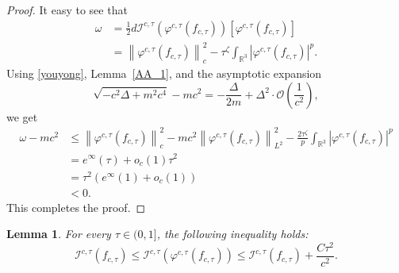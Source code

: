 \documentclass{amsart}
\theoremstyle{plain}
\newtheorem{lemma}[theorem]{Lemma}
\theoremstyle{definition}
\theoremstyle{remark}
\numberwithin{equation}{section} \numberwithin{figure}{section}
\begin{document}
          \begin{proof}
            It easy to see that
          \begin{equation*}
          \begin{aligned}
          \omega &= \frac{1}{2} d\mathcal{I}^{c,\tau}\left(\varphi^{c,\tau}(f_{c,\tau})\right)\left[\varphi^{c,\tau}(f_{c,\tau})\right] \\
          &= \left\|\varphi^{c,\tau}(f_{c,\tau})\right\|_c^2 - \tau^{\zeta} \int_{\mathbb{R}^3} \left|\varphi^{c,\tau}(f_{c,\tau})\right|^p.
          \end{aligned}
          \end{equation*}          
          Using \eqref{youyong}, Lemma~\ref{AA_1}, and the asymptotic expansion
          \[
          \sqrt{-c^2\Delta + m^2c^4} - mc^2 = -\frac{\Delta}{2m} + \Delta^2 \cdot \mathcal{O}\left(\frac{1}{c^2}\right),
          \]
          we get
          \begin{equation}
          \begin{aligned}
          \omega - mc^2 &\leq \left\|\varphi^{c,\tau}(f_{c,\tau})\right\|_c^2 - mc^2 \left\|\varphi^{c,\tau}(f_{c,\tau})\right\|_{L^2}^2 - \frac{2\tau^\zeta}{p} \int_{\mathbb{R}^3} \left|\varphi^{c,\tau}(f_{c,\tau})\right|^p \\
          &= e^\infty(\tau) + o_c(1)\tau^2 \\
          &= \tau^2 \left(e^{\infty}(1) + o_c(1)\right) \\
          &< 0.
          \end{aligned}
          \end{equation}
          This completes the proof.
          \end{proof}
          




          

          \begin{lemma}\label{stb_12}
            For every $\tau \in (0,1]$, the following inequality holds:
            \[
            \mathcal{I}^{c,\tau}(f_{c,\tau}) \leq \mathcal{I}^{c,\tau}(\varphi^{c,\tau}(f_{c, \tau})) \leq \mathcal{I}^{c,\tau}(f_{c,\tau}) + \frac{C\tau^2}{c^2}.
            \]
            \end{lemma}
            
\end{document}
